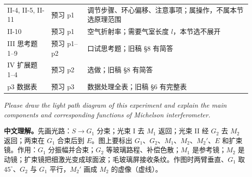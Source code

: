 \documentclass[11pt]{ctexart}
\begin{document}
\begin{center}
\small
\begin{tabular}{@{}L{3.0cm}L{4.2cm}L{6.0cm}@{}}
\toprule
{} &  & \\
\midrule
II-4, II-5, II-11 & 预习 p1 & 调节步骤、环心偏移、注意事项；属操作，不属本节选原理范围\\
II-10 & 预习 p1 & 空气折射率；需要气室长度 \(l\)，本节选不展开\\
III 思考题 1--9 & 预习 p1--p2 & 口试思考题；旧稿 §8 有简答\\
IV 扩展题 1--4 & 预习 p2 & 选做；旧稿 §8 有简答\\
p3 数据表 & 预习 p3 & 数据处理全表；旧稿 §6 有完整表\\
\bottomrule
\end{tabular}
\end{center}


\textit{Please draw the light path diagram of this experiment and explain the main components and corresponding functions of Michelson interferometer.}

\textbf{中文理解。}先画光路：\(S\to G_1\) 分束；光束 I 去 \(M_1\) 返回；光束 II 经 \(G_2\) 去 \(M_2\) 返回；两束在 \(G_1\) 合束后到 \(E\)。图上要标出 \(G_1\)、\(G_2\)、\(M_1\)、\(M_2\)、\(M_2'\)、\(E\) 和扩束镜。作用：\(G_1\) 分振幅并合束；\(G_2\) 等玻璃路程、补偿色散；\(M_1\) 是参考镜；\(M_2\) 是动镜；扩束镜把细激光变成球面波；毛玻璃屏接收条纹。作图时两臂垂直、\(G_1\) 取 \(45^\circ\)、\(G_2\) 与 \(G_1\) 平行，\(M_2'\) 画成 \(M_2\) 的虚像（虚线）。
\end{document}
